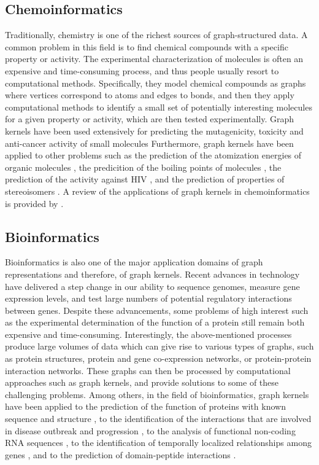 \documentclass[twoside,11pt]{article}
\begin{document}
\subsection{Chemoinformatics}
Traditionally, chemistry is one of the richest sources of graph-structured data.
A common problem in this field is to find chemical compounds with a specific property or activity.
The experimental characterization of molecules is often an expensive and time-consuming process, and thus people usually resort to computational methods.
Specifically, they model chemical compounds as graphs where vertices correspond to atoms and edges to bonds, and then they apply computational methods to identify a small set of potentially interesting molecules for a given property or activity, which are then tested experimentally.
Graph kernels have been used extensively for predicting the mutagenicity, toxicity and anti-cancer activity of small molecules 
Furthermore, graph kernels have been applied to other problems such as the prediction of the atomization energies of organic molecules , the predicition of the boiling points of molecules , the prediction of the activity against HIV , and the prediction of properties of stereoisomers .
A review of the applications of graph kernels in chemoinformatics is provided by .

\subsection{Bioinformatics}
Bioinformatics is also one of the major application domains of graph representations and therefore, of graph kernels.
Recent advances in technology have delivered a step change in our ability to sequence genomes, measure gene expression levels, and test large numbers of potential regulatory interactions between genes.
Despite these advancements, some problems of high interest such as the experimental determination of the function of a protein still remain both expensive and time-consuming.
Interestingly, the above-mentioned processes produce large volumes of data which can give rise to various types of graphs, such as protein structures, protein and gene co-expression networks, or protein-protein interaction networks.
These graphs can then be processed by computational approaches such as graph kernels, and provide solutions to some of these challenging problems. 
Among others, in the field of bioinformatics, graph kernels have been applied to the prediction of the function of proteins with known sequence and structure , to the identification of the interactions that are involved in disease outbreak and progression , to the analysis of functional non-coding RNA sequences , to the identification of temporally localized relationships among genes , and to the prediction of domain-peptide interactions .
\end{document}
